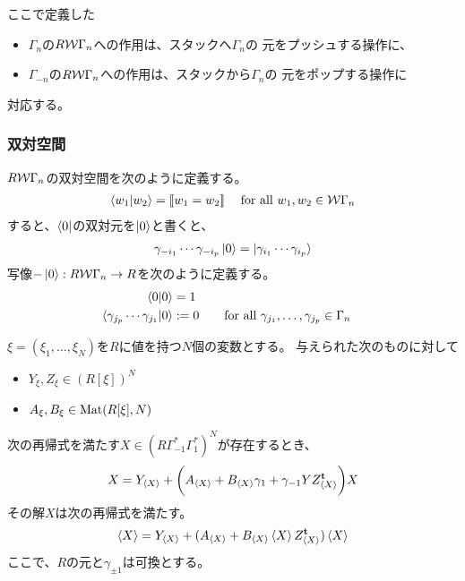 {	ここで定義した
	\begin{itemize}\setlength{\itemsep}{-1mm} %
		\item $\Gamma_n$の$R{{\mathcal{W}}}\Gamma_n$への作用は、スタックへ$\Gamma_n$の
		元をプッシュする操作に、
		\item $\Gamma_{-n}$の$R{{\mathcal{W}}}\Gamma_n$への作用は、スタックから$\Gamma_n$の
		元をポップする操作に
	\end{itemize} %
	対応する。
\subsubsection{双対空間}\label{s3:スタックの双対空間} %
	$R{{\mathcal{W}}}\Gamma_n$の双対空間を次のように定義する。
	\begin{equation*}\begin{split}
		\mathinner{\langle{w_1|w_2}\rangle} = [\![w_1=w_2]\!]\;
		\quad\text{for all } w_1,w_2\in{\ensuremath{{\mathcal{W}}}}\Gamma_n
	\end{split}\end{equation*}
	すると、$\mathinner{\langle{0}|}$の双対元を$\mathinner{|{0}\rangle}$と書くと、
	\begin{equation*}\begin{split}
		\gamma_{-i_1}\cdots\gamma_{-i_p}\mathinner{|{0}\rangle}
		= \mathinner{|{\gamma_{i_1}\cdots\gamma_{i_p}}\rangle}
	\end{split}\end{equation*}
	写像$-\mathinner{|{0}\rangle}:R{{\mathcal{W}}}\Gamma_n\to R$を次のように定義する。
	\begin{alignat*}{2}
		\mathinner{\langle{0|0}\rangle} &= 1 \\
		\mathinner{\langle{\gamma_{j_p}\cdots\gamma_{j_1}|0}\rangle}
		&:= 0 &\quad& \text{for all } \gamma_{j_1},\dots,\gamma_{j_p}\in\Gamma_n
	\end{alignat*}

	\begin{proposition}[Dyck経路その一]\label{prop:Dyck経路その一} %
		$\xi=(\xi_1,\dots,\xi_N)$を$R$に値を持つ$N$個の変数とする。
		与えられた次のものに対して
		\begin{itemize}\setlength{\itemsep}{-1mm} %
			\item $Y_\xi,Z_\xi\in(R[\xi])^N$
			\item $A_\xi,B_\xi\in{\ensuremath{\operatorname{Mat}}}(R[\xi],N)$
		\end{itemize} %
		次の再帰式を満たす$X\in(R\Gamma_{-1}^*\Gamma_1^*)^N$が存在するとき、
		\begin{equation*}\begin{split}
			X = Y_{\mathinner{\langle{X}\rangle}} + \biggl(A_{\mathinner{\langle{X}\rangle}} + B_{\mathinner{\langle{X}\rangle}}\gamma_1 
				+ \gamma_{-1}YZ_{\mathinner{\langle{X}\rangle}}^{\mathbf{t}}\biggr)X \\
		\end{split}\end{equation*}
		その解$X$は次の再帰式を満たす。
		\begin{equation*}\begin{split}
			\mathinner{\langle{X}\rangle} = Y_{\mathinner{\langle{X}\rangle}} + (A_{\mathinner{\langle{X}\rangle}} 
			+ B_{\mathinner{\langle{X}\rangle}}\mathinner{\langle{X}\rangle}Z_{\mathinner{\langle{X}\rangle}}^{\mathbf{t}})\mathinner{\langle{X}\rangle}
		\end{split}\end{equation*}
		ここで、$R$の元と$\gamma_{\pm 1}$は可換とする。
	\end{proposition} %

}
